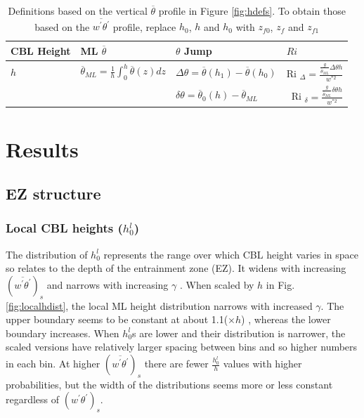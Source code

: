 \begin{table}[htbp]
\caption[Height definitions]{Definitions based on the vertical $\overline{\theta}$ profile in Figure \ref{fig:hdefs}. To obtain those based on the $\overline{w^{'}\theta^{'}}$ profile, replace $h_{0}$, $h$ and $h_{0}$ with $z_{f0}$, $z_{f}$ and $z_{f1}$}


    \begin{tabular}{p{} p{} p{3cm} p{2.5cm}}
    
      CBL Height & ML $\overline{\theta}$ & $\theta$ Jump &$     Ri $\\ \hline 
       $h$ & $\overline{\theta}_{ML} = \frac{1}{h}\int^{h}_{0}\overline{\theta}(z)dz$ & $\Delta \theta=\overline{\theta}(h_{1})-\overline{\theta}(h_{0})$ &      Ri $_{\Delta}=\frac{\frac{g}{\overline{\theta}_{ML}}\Delta \theta h}{w^{*2}}$  \\ [.3cm] 
        
       & &$\delta \theta = \overline{\theta}_{0}(h)- \overline{\theta}_{ML}$ & \    Ri $_{\delta}=\frac{\frac{g}{\overline{\theta}_{ML}} \delta \theta h}{w^{*2}}$ \\ \hline
      \end{tabular}

\label{tab:reldefs}   
    
\end{table}

\section{Results}
\subsection{EZ structure}

\subsubsection{Local CBL heights ($h_{0}^{l}$)}
\label{subsubsec:loccblh}

The distribution of $h_{0}^{l}$ represents the range over which CBL height varies in space so relates to the depth of the entrainment zone (EZ).  It widens with increasing $(\overline{w^{'}\theta^{'}})_{s}$ and narrows with increasing $\gamma$ \citep{NChap14}.  When scaled by $h$ in Fig. \ref{fig:localhdist}, the local ML height distribution narrows with increased $\gamma$.  The upper boundary seems to be constant at about 1.1($\times h$) , whereas the lower boundary increases.  When $h_{0}^{l}$s are lower and their distribution is narrower, the scaled versions have relatively larger spacing between bins and so higher numbers in each bin. At higher $(\overline{w^{'}\theta^{'}})_{s}$ there are fewer $\frac{h_{0}^{l}}{h}$ values with higher probabilities, but the width of the distributions seems more or less constant regardless of $(w^{'}\theta^{'})_{s}$.\\


